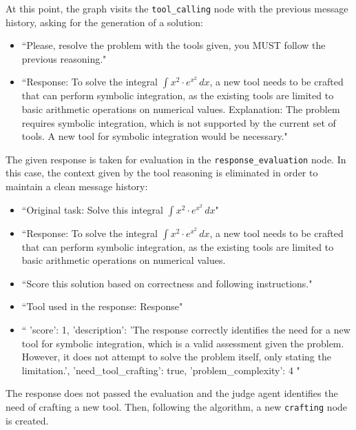 \documentclass[12pt,a4paper,openright,twoside]{book}
\begin{document}
At this point, the graph visits the \texttt{tool\_calling} node with the previous message history, asking for the generation of a solution:
\begin{itemize}
    \item[\textbf{System:}] ``Please, resolve the problem with the tools given, you MUST follow the previous reasoning."
    \item[\textbf{AI:}] ``Response: To solve the integral $\int x^2 \cdot e^{x^2} \, dx$, a new tool needs to be crafted that can perform symbolic integration, as the existing tools are limited to basic arithmetic operations on numerical values.  
    Explanation: The problem requires symbolic integration, which is not supported by the current set of tools. A new tool for symbolic integration would be necessary."
\end{itemize}

The given response is taken for evaluation in the \texttt{response\_evaluation} node. In this case, the context given by the tool reasoning is eliminated in order to maintain a clean message history:
\begin{itemize}
    \item[\textbf{Node Prompt:}] ``Original task: Solve this integral $\int x^2 \cdot e^{x^2} \, dx$"
    \item[\textbf{Node Prompt:}] ``Response: To solve the integral $\int x^2 \cdot e^{x^2} \, dx$, a new tool needs to be crafted that can perform symbolic integration, as the existing tools are limited to basic arithmetic operations on numerical values. 
    \item[\textbf{System:}] ``Score this solution based on correctness and following instructions."
    \item[\textbf{AI:}] ``Tool used in the response: Response"
    \item[\textbf{AI:}] ``{ 'score': 1, 'description': 'The response correctly identifies the need for a new tool for symbolic integration, which is a valid assessment given the problem. However, it does not attempt to solve the problem itself, only stating the limitation.', 'need\_tool\_crafting': true, 'problem\_complexity': 4 }"
\end{itemize}

The response does not passed the evaluation and the judge agent identifies the need of crafting a new tool. Then, following the algorithm, a new \texttt{crafting} node is created.
\end{document}
